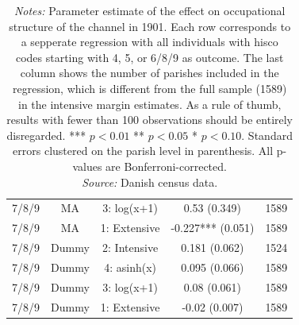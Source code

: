 \begin{table}[]
\begin{tabular}{ccccc}
7/8/9 & MA & 3: log(x+1) & 0.53 (0.349) & 1589\\
7/8/9 & MA & 1: Extensive & -0.227*** (0.051) & 1589\\
7/8/9 & Dummy & 2: Intensive & 0.181 (0.062) & 1524\\
7/8/9 & Dummy & 4: asinh(x) & 0.095 (0.066) & 1589\\
7/8/9 & Dummy & 3: log(x+1) & 0.08 (0.061) & 1589\\
7/8/9 & Dummy & 1: Extensive & -0.02 (0.007) & 1589\\
\bottomrule
\end{tabular}
\parbox{0.9\textwidth}{
\caption*{\footnotesize \textit{Notes:} Parameter estimate of the effect on occupational structure of the channel in 1901. Each row corresponds to a sepperate regression with all individuals with hisco codes starting with 4, 5, or 6/8/9 as outcome. The last column shows the number of parishes included in the regression, which is different from the full sample (1589) in the intensive margin estimates. As a rule of thumb, results with fewer than 100 observations should be entirely disregarded. *** $p< 0.01$ ** $p< 0.05$ * $p< 0.10$. Standard errors clustered on the parish level in parenthesis. All p-values are Bonferroni-corrected. \\ \textit{Source:} Danish census data.}
}
\end{table}

\FloatBarrier

